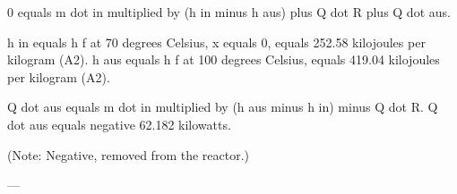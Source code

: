 0 equals m dot in multiplied by (h in minus h aus) plus Q dot R plus Q dot aus.  

h in equals h f at 70 degrees Celsius, x equals 0, equals 252.58 kilojoules per kilogram (A2).  
h aus equals h f at 100 degrees Celsius, equals 419.04 kilojoules per kilogram (A2).  

Q dot aus equals m dot in multiplied by (h aus minus h in) minus Q dot R.  
Q dot aus equals negative 62.182 kilowatts.  

(Note: Negative, removed from the reactor.)  

---